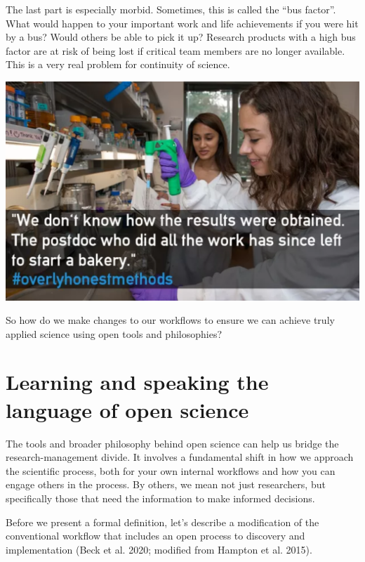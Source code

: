 \documentclass[
  letterpaper,
  DIV=11,
  numbers=noendperiod]{scrreprt}
\begin{document}
The last part is especially morbid. Sometimes, this is called the ``bus
factor''. What would happen to your important work and life achievements
if you were hit by a bus? Would others be able to pick it up? Research
products with a high bus factor are at risk of being lost if critical
team members are no longer available. This is a very real problem for
continuity of science.

\includegraphics{./img/overlyhonest.png}

So how do we make changes to our workflows to ensure we can achieve
truly applied science using open tools and philosophies?

\hypertarget{learning-and-speaking-the-language-of-open-science}{%
\section{Learning and speaking the language of open
science}\label{learning-and-speaking-the-language-of-open-science}}

The tools and broader philosophy behind open science can help us bridge
the research-management divide. It involves a fundamental shift in how
we approach the scientific process, both for your own internal workflows
and how you can engage others in the process. By others, we mean not
just researchers, but specifically those that need the information to
make informed decisions.

Before we present a formal definition, let's describe a modification of
the conventional workflow that includes an open process to discovery and
implementation (Beck et al. 2020; modified from Hampton et al. 2015).
\end{document}

